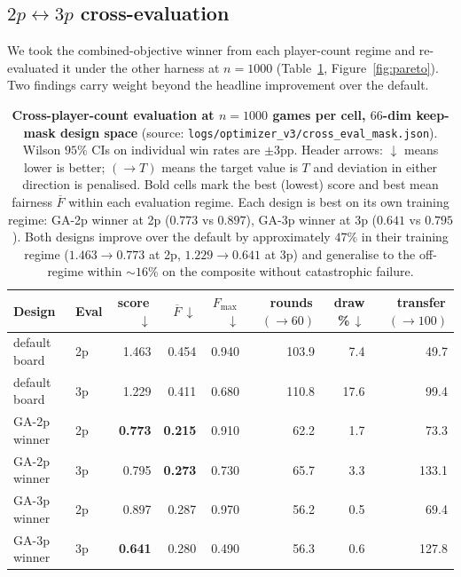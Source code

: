 \documentclass[10pt]{article}
\begin{document}
\subsection{$2p\!\leftrightarrow\!3p$ cross-evaluation}\label{sec:cross}

We took the combined-objective winner from each player-count regime
and re-evaluated it under the other harness at $n{=}1000$
(Table~\ref{tab:cross}, Figure~\ref{fig:pareto}). Two findings carry
weight beyond the headline improvement over the default.

\begin{table}[h!]
\centering
\small
\begin{tabular}{llrrrrrr}
\toprule
Design & Eval & score\,$\downarrow$ & $\overline{F}$\,$\downarrow$ & $F_{\max}$\,$\downarrow$ & rounds\,$(\!\to\!60)$ & draw \%\,$\downarrow$ & transfer\,$(\!\to\!100)$ \\
\midrule
default board    & 2p & 1.463 & 0.454 & 0.940 & 103.9 &  7.4 &  49.7 \\
default board    & 3p & 1.229 & 0.411 & 0.680 & 110.8 & 17.6 &  99.4 \\
\addlinespace
GA-2p winner     & 2p & \textbf{0.773} & \textbf{0.215} & 0.910 &  62.2 &  1.7 &  73.3 \\
GA-2p winner     & 3p & 0.795 & \textbf{0.273} & 0.730 &  65.7 &  3.3 & 133.1 \\
\addlinespace
GA-3p winner     & 2p & 0.897 & 0.287 & 0.970 &  56.2 &  0.5 &  69.4 \\
GA-3p winner     & 3p & \textbf{0.641} & 0.280 & 0.490 &  56.3 &  0.6 & 127.8 \\
\bottomrule
\end{tabular}
\caption{\textbf{Cross-player-count evaluation at $n{=}1000$ games
per cell, $66$-dim keep-mask design space} (source:
\texttt{logs/optimizer\_v3/cross\_eval\_mask.json}). Wilson $95\%$
CIs on individual win rates are $\pm 3$pp. Header arrows:
$\downarrow$ means lower is better; $(\!\to\!T)$ means the target
value is $T$ and deviation in either direction is penalised. Bold
cells mark the best (lowest) score and best mean fairness
$\overline{F}$ within each evaluation regime. Each design is best
on its own training regime: GA-2p winner at 2p
($0.773$ vs $0.897$), GA-3p winner at 3p ($0.641$ vs $0.795$). Both
designs improve over the default by approximately $47\%$ in their
training regime ($1.463 \!\to\! 0.773$ at 2p, $1.229 \!\to\! 0.641$
at 3p) and generalise to the off-regime within $\sim 16\%$ on the
composite without catastrophic failure.}
\label{tab:cross}
\end{table}
\end{document}
